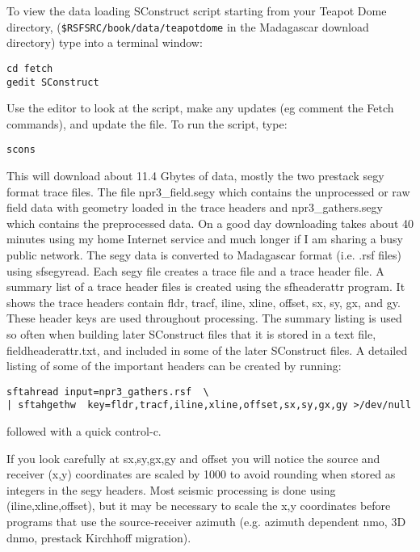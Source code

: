 To view the data loading SConstruct script starting from your Teapot Dome directory, (\texttt{\$RSFSRC/book/data/teapotdome} in the Madagascar download directory) type into a terminal window:

\begin{verbatim}
cd fetch
gedit SConstruct
\end{verbatim}  

Use the editor to look at the script, make any updates (eg comment the Fetch
commands), and update the file.  To run the script, type:

\begin{verbatim}
scons 
\end{verbatim}  

This will download about 11.4 Gbytes of data, mostly the two prestack segy format trace files.  The file npr3\_field.segy which contains the unprocessed or raw field data with geometry loaded in the trace headers and npr3\_gathers.segy which contains the preprocessed data.  On a good day downloading takes about 40 minutes using my home Internet service and much longer if I am sharing a busy public network.   The segy data is converted to Madagascar format (i.e. .rsf files) using sfsegyread.  Each segy file creates a trace file and a trace header file.  A summary list of a trace header files is created using the sfheaderattr program.  It shows the trace headers contain fldr, tracf, iline, xline, offset, sx, sy, gx, and gy.  These header keys are used throughout processing.  The summary listing is used so often when building later SConstruct files that it is stored in a text file, fieldheaderattr.txt, and included in some of the later SConstruct files.  A detailed listing of some of the important headers can be created by running:

\begin{verbatim}
sftahread input=npr3_gathers.rsf  \
| sftahgethw  key=fldr,tracf,iline,xline,offset,sx,sy,gx,gy >/dev/null
\end{verbatim}

followed with a quick control-c.

If you look carefully at sx,sy,gx,gy and offset you will notice the source and receiver (x,y) coordinates are scaled by 1000 to avoid rounding when stored as integers in the segy headers.  Most seismic processing is done using (iline,xline,offset), but it may be necessary to scale the x,y coordinates before programs that use the source-receiver azimuth (e.g. azimuth dependent nmo, 3D dnmo, prestack Kirchhoff migration).

